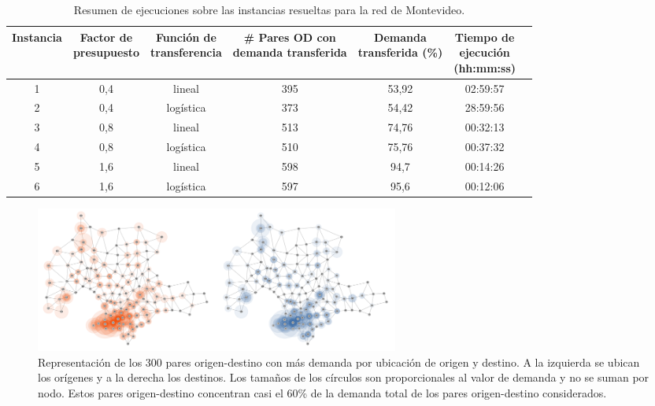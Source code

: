 \begin{table}[h!]
  \centering
  \begin{adjustbox}{width=1.2\textwidth,center=\textwidth}
    \begin{tabular}{ccccccc}
      \toprule
        Instancia & \shortstack{Factor de \\ presupuesto} & \shortstack{Función de \\ transferencia} & \shortstack{\# Pares OD con \\ demanda transferida} & \shortstack{Demanda \\ transferida (\%)} & \shortstack{Tiempo de \\ ejecución \\ (hh:mm:ss)} \\
      \midrule
        1 & 0,4 & lineal & 395 & 53,92 & 02:59:57 \\
        2 & 0,4 & logística & 373 & 54,42 & 28:59:56 \\
        3 & 0,8 & lineal & 513 & 74,76 & 00:32:13 \\
        4 & 0,8 & logística & 510 & 75,76 & 00:37:32 \\
        5 & 1,6 & lineal & 598 & 94,7 & 00:14:26 \\
        6 & 1,6 & logística & 597 & 95,6 & 00:12:06 \\
      \bottomrule
    \end{tabular}
  \end{adjustbox}
  \caption{Resumen de ejecuciones sobre las instancias resueltas para la red de Montevideo.}\label{table:montevideoexecutions}
\end{table}

\begin{figure}[h!]
  \centering
  \includegraphics[width=12cm]{../resources/montevideo_demands.png}
    \caption{Representación de los 300 pares origen-destino con más demanda por ubicación de origen y destino. A la izquierda se ubican los orígenes y a la derecha los destinos. Los tamaños de los círculos son proporcionales al valor de demanda y no se suman por nodo. Estos pares origen-destino concentran casi el 60\% de la demanda total de los pares origen-destino considerados.}
  \label{fig:montevideodemanddist}
\end{figure}

